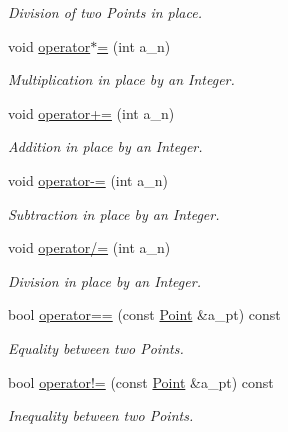 \begin{DoxyCompactItemize}
\begin{DoxyCompactList}\small\item\em Division of two Points in place. \end{DoxyCompactList}\item 
\mbox{\label{class_point_a79d9895cf934366e864a69a483e5b8ad}} 
void \hyperlink{class_point_a79d9895cf934366e864a69a483e5b8ad}{operator$\ast$=} (int a\+\_\+n)
\begin{DoxyCompactList}\small\item\em Multiplication in place by an Integer. \end{DoxyCompactList}\item 
\mbox{\label{class_point_ae6e49461a0bc525c0f55bd5ce42db45b}} 
void \hyperlink{class_point_ae6e49461a0bc525c0f55bd5ce42db45b}{operator+=} (int a\+\_\+n)
\begin{DoxyCompactList}\small\item\em Addition in place by an Integer. \end{DoxyCompactList}\item 
\mbox{\label{class_point_a880f2ce648e6011177058678f6b2021b}} 
void \hyperlink{class_point_a880f2ce648e6011177058678f6b2021b}{operator-\/=} (int a\+\_\+n)
\begin{DoxyCompactList}\small\item\em Subtraction in place by an Integer. \end{DoxyCompactList}\item 
void \hyperlink{class_point_a62ab14874fced136ff69ed4cf6d34c90}{operator/=} (int a\+\_\+n)
\begin{DoxyCompactList}\small\item\em Division in place by an Integer. \end{DoxyCompactList}\item 
bool \hyperlink{class_point_a8cf841adb026628dda2df391952ece75}{operator==} (const \hyperlink{class_point}{Point} \&a\+\_\+pt) const
\begin{DoxyCompactList}\small\item\em Equality between two Points. \end{DoxyCompactList}\item 
bool \hyperlink{class_point_abc6eed13223637f36a7d00adadb20931}{operator!=} (const \hyperlink{class_point}{Point} \&a\+\_\+pt) const
\begin{DoxyCompactList}\small\item\em Inequality between two Points. \end{DoxyCompactList}\item 

\end{DoxyCompactItemize}
